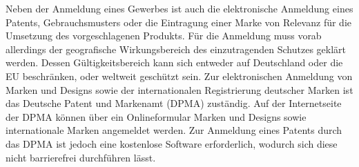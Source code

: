 Neben der Anmeldung eines Gewerbes ist auch die elektronische Anmeldung eines Patents, Gebrauchsmusters oder die Eintragung einer Marke von Relevanz für die Umsetzung des vorgeschlagenen Produkts. Für die Anmeldung muss vorab allerdings der geografische Wirkungsbereich des einzutragenden Schutzes geklärt werden. Dessen Gültigkeitsbereich kann sich entweder auf Deutschland oder die EU beschränken, oder weltweit geschützt sein.
Zur elektronischen Anmeldung von Marken und Designs sowie der internationalen Registrierung deutscher Marken ist das Deutsche Patent und Markenamt (DPMA) zuständig. Auf der Internetseite der DPMA können über ein Onlineformular Marken und Designs sowie internationale Marken angemeldet werden. Zur Anmeldung eines Patents durch das DPMA ist jedoch eine kostenlose Software erforderlich, wodurch sich diese nicht barrierefrei durchführen lässt.
